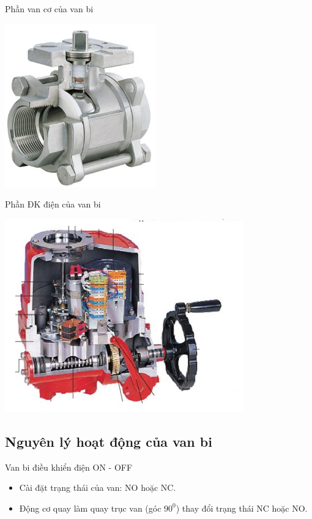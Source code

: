 \documentclass[20pt]{beamer}
\begin{document}
\begin{frame}{Phần van cơ của van bi}
\vspace{-.5cm}
\begin{center}
	\includegraphics[scale=.7]{images/phan-co-van-bi.png} 
\end{center}
\end{frame}

\begin{frame}{Phần ĐK điện của van bi}
\vspace{-.5cm}
\begin{center}
\includegraphics[scale=.6]{images/phan-dien-van-bi.png} 
\end{center}
\end{frame}

\subsection*{Nguyên lý hoạt động của van bi}
\begin{frame}{Van bi điều khiển điện ON - OFF}
\begin{itemize}
\justifying
	\item Cài đặt trạng thái của van: NO hoặc NC.
	\item Động cơ quay làm quay trục van (góc $90^0$) thay đổi trạng thái NC hoặc NO.
\end{itemize}
\end{frame}
\end{document}

